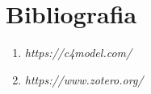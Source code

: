 \section{Bibliografia}

\begin{enumerate}

\item {\textit {https://c4model.com/}}
\item {\textit {https://www.zotero.org/}}

\end{enumerate}